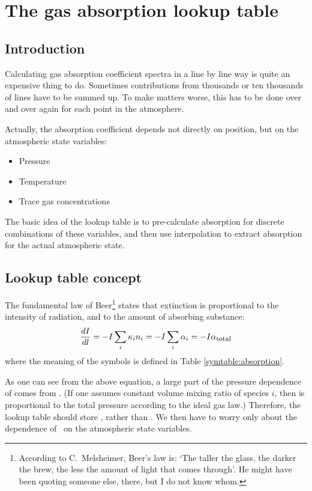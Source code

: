 \section{The gas absorption lookup table}
\label{sec:absorption:lookup}

\subsection{Introduction}

Calculating gas absorption coefficient spectra in a line by line way
is quite an expensive thing to do. Sometimes contributions from
thousands or ten thousands of lines have to be summed up. To make
matters worse, this has to be done over and over again for each point
in the atmosphere.

Actually, the absorption coefficient depends not directly on position,
but on the atmospheric state variables:
\begin{itemize}
\item Pressure
\item Temperature
\item Trace gas concentrations
\end{itemize}

The basic idea of the lookup table is to pre-calculate absorption for
discrete combinations of these variables, and then use interpolation
to extract absorption for the actual atmospheric state.

\subsection{Lookup table concept}

The fundamental law of Beer\footnote{According to C.\ Melsheimer,
  Beer's law is: `The taller the glass, the darker the brew, the less
  the amount of light that comes through'. He might have been quoting
  someone else, there, but I do not know whom.} states that extinction
is proportional to the intensity of radiation, and to the amount of
absorbing substance:
\begin{equation}
  \label{eq:lookup:beer}
  \frac{d I}{d l}
  =
  - I \sum_i {\kappa}_{i} {n}_{i}
  =
  - I \sum_i {\alpha}_{i}
  =
  - I {\alpha}_{\mbox{\footnotesize total}}
\end{equation}
where the meaning of the symbols is defined in Table
\ref{symtable:absorption}. 

As one can see from the above equation, a large part of the pressure
dependence of  comes from . (If one assumes
constant volume mixing ratio of species $i$, then  is
proportional to the total pressure according to the ideal gas law.) 
Therefore, the lookup table should store \AbsXsec, rather than
\AbsCoef. We then have to worry only about the dependence of \AbsXsec\
on the atmospheric state variables.

